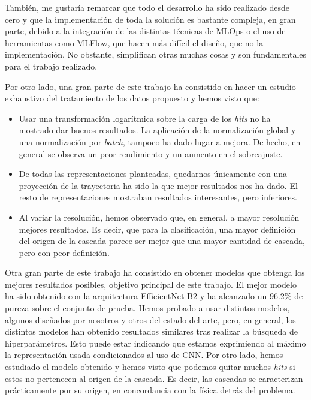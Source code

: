 \documentclass[a4paper,12pt,oneside,titlepage]{book}
\begin{document}
También, me gustaría remarcar que todo el desarrollo ha sido realizado desde cero y que la implementación de toda la solución es bastante compleja, en gran parte, debido a la integración de las distintas técnicas de MLOps o el uso de herramientas como MLFlow, que hacen más difícil el diseño, que no la implementación. No obstante, simplifican otras muchas cosas y son fundamentales para el trabajo realizado. 

Por otro lado, una gran parte de este trabajo ha consistido en hacer un estudio exhaustivo del tratamiento de los datos propuesto y hemos visto que:
\begin{itemize}
  \item Usar una transformación logarítmica sobre la carga de los \textit{hits} no ha mostrado dar buenos resultados. La aplicación de la normalización global y una normalización por \textit{batch}, tampoco ha dado lugar a mejora. De hecho, en general se observa un peor rendimiento y un aumento en el sobreajuste.
  \item De todas las representaciones planteadas, quedarnos únicamente con una proyección de la trayectoria ha sido la que mejor resultados nos ha dado. El resto de representaciones mostraban resultados interesantes, pero inferiores.
  \item Al variar la resolución, hemos observado que, en general, a mayor resolución mejores resultados. Es decir, que para la clasificación, una mayor definición del origen de la cascada parece ser mejor que una mayor cantidad de cascada, pero con peor definición.
\end{itemize}

Otra gran parte de este trabajo ha consistido en obtener modelos que obtenga los mejores resultados posibles, objetivo principal de este trabajo. El mejor modelo ha sido obtenido con la arquitectura EfficientNet B2 y ha alcanzado un 96.2\% de pureza sobre el conjunto de prueba. Hemos probado a usar distintos modelos, algunos diseñados por nosotros y otros del estado del arte, pero, en general, los distintos modelos han obtenido resultados similares tras realizar la búsqueda de hiperparámetros. Esto puede estar indicando que estamos exprimiendo al máximo la representación usada condicionados al uso de CNN. Por otro lado, hemos estudiado el modelo obtenido y hemos visto que podemos quitar muchos \textit{hits} si estos no pertenecen al origen de la cascada. Es decir, las cascadas se caracterizan prácticamente por su origen, en concordancia con la física detrás del problema.
\end{document}
